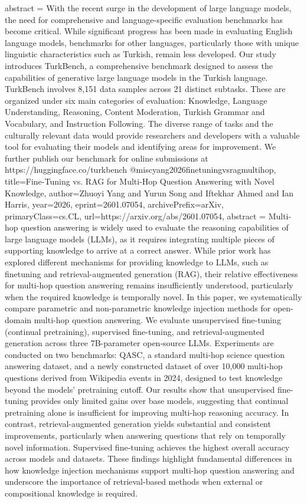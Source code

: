 {      abstract = {With the recent surge in the development of large language models, the need for comprehensive and language-specific evaluation benchmarks has become critical. While significant progress has been made in evaluating English language models, benchmarks for other languages, particularly those with unique linguistic characteristics such as Turkish, remain less developed. Our study introduces TurkBench, a comprehensive benchmark designed to assess the capabilities of generative large language models in the Turkish language. TurkBench involves 8,151 data samples across 21 distinct subtasks. These are organized under six main categories of evaluation: Knowledge, Language Understanding, Reasoning, Content Moderation, Turkish Grammar and Vocabulary, and Instruction Following. The diverse range of tasks and the culturally relevant data would provide researchers and developers with a valuable tool for evaluating their models and identifying areas for improvement. We further publish our benchmark for online submissions at https://huggingface.co/turkbench}
}@misc{yang2026finetuningvsragmultihop,
      title={Fine-Tuning vs. RAG for Multi-Hop Question Answering with Novel Knowledge}, 
      author={Zhuoyi Yang and Yurun Song and Iftekhar Ahmed and Ian Harris},
      year={2026},
      eprint={2601.07054},
      archivePrefix={arXiv},
      primaryClass={cs.CL},
      url={https://arxiv.org/abs/2601.07054},
      abstract = {Multi-hop question answering is widely used to evaluate the reasoning capabilities of large language models (LLMs), as it requires integrating multiple pieces of supporting knowledge to arrive at a correct answer. While prior work has explored different mechanisms for providing knowledge to LLMs, such as finetuning and retrieval-augmented generation (RAG), their relative effectiveness for multi-hop question answering remains insufficiently understood, particularly when the required knowledge is temporally novel.   In this paper, we systematically compare parametric and non-parametric knowledge injection methods for open-domain multi-hop question answering. We evaluate unsupervised fine-tuning (continual pretraining), supervised fine-tuning, and retrieval-augmented generation across three 7B-parameter open-source LLMs. Experiments are conducted on two benchmarks: QASC, a standard multi-hop science question answering dataset, and a newly constructed dataset of over 10,000 multi-hop questions derived from Wikipedia events in 2024, designed to test knowledge beyond the models' pretraining cutoff.   Our results show that unsupervised fine-tuning provides only limited gains over base models, suggesting that continual pretraining alone is insufficient for improving multi-hop reasoning accuracy. In contrast, retrieval-augmented generation yields substantial and consistent improvements, particularly when answering questions that rely on temporally novel information. Supervised fine-tuning achieves the highest overall accuracy across models and datasets. These findings highlight fundamental differences in how knowledge injection mechanisms support multi-hop question answering and underscore the importance of retrieval-based methods when external or compositional knowledge is required.}
}
